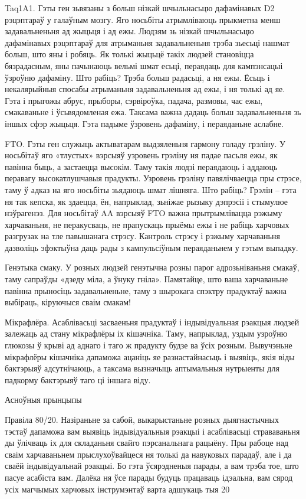 Taq1A1.
Гэты ген зьвязаны з больш нізкай шчыльнасьцю дафамінавых D2 рэцэптараў у галаўным мозгу. Яго носьбіты атрымліваюць прыкметна менш задавальненьня ад жыцьця і ад ежы. Людзям зь нізкай шчыльнасьцю дафамінавых рэцэптараў для атрыманьня задавальненьня трэба зьесьці нашмат больш, што яны і робяць. Як толькі жыцьцё такіх людзей становіцца бязрадасным, яны пачынаюць вельмі шмат есьці, пераядаць для кампэнсацыі ўзроўню дафаміну. Што рабіць? Трэба больш радасьці, а ня ежы. Ёсьць і некалярыйныя спосабы атрыманьня задавальненьня ад ежы, і ня толькі ад яе. Гэта і прыгожы абрус, прыборы, сэрвіроўка, падача, размовы, час ежы, смакаваньне і ўсьвядомленая ежа. Таксама важна дадаць больш задавальненьня зь іншых сфэр жыцьця. Гэта падыме ўзровень дафаміну, і пераяданьне аслабне.

FTO.
Гэты ген служыць актыватарам выдзяленьня гармону голаду грэліну. У носьбітаў яго «тлустых» вэрсыяў узровень грэліну ня падае пасьля ежы, як павінна быць, а застаецца высокім. Таму такія людзі пераядаюць і аддаюць перавагу высокатлушчавыя прадукты. Узровень грэліну павялічваецца пры стрэсе, таму ў адказ на яго носьбіты зьядаюць шмат лішняга. Што рабіць? Грэлін – гэта ня так кепска, як здаецца, ён, напрыклад, зьніжае рызыку дэпрэсіі і стымулюе нэўрагенэз. Для носьбітаў AA вэрсыяў FTO важна прытрымлівацца рэжыму харчаваньня, не перакусваць, не прапускаць прыёмы ежы і не рабіць харчовых разгрузак на тле павышанага стрэсу. Кантроль стрэсу і рэжыму харчаваньня дазволіць эфэктыўна даць рады з кампульсіўным пераяданьнем у гэтым выпадку.

Генэтыка смаку.
У розных людзей генэтычна розны парог адрозьніваньня смакаў, таму сапраўды «дзеду міла, а ўнуку гніла». Памятайце, што ваша харчаваньне павінна прыносіць задавальненьне, таму з шырокага спэктру прадуктаў важна выбіраць, кіруючыся сваім смакам!

Мікрафлёра.
Асаблівасьці засваеньня прадуктаў і індывідуальная рэакцыя людзей залежаць ад стану мікрафлёры іх кішачніка. Таму, напрыклад, уздым узроўню глюкозы ў крыві ад аднаго і таго ж прадукту будзе ва ўсіх розным. Вывучэньне мікрафлёры кішачніка дапаможа ацаніць яе разнастайнасьць і выявіць, якія віды бактэрыяў адсутнічаюць, а таксама вызначыць аптымальныя нутрыенты для падкорму бактэрыяў таго ці іншага віду.

Асноўныя прынцыпы

Правіла 80/20.
Назіраньне за сабой, выкарыстаньне розных дыягнастычных тэстаў дапаможа вам выявіць індывідуальныя рэакцыі і асаблівасьці страваваньня ды ўлічваць іх для складаньня свайго пэрсанальнага рацыёну. Пры рабоце над сваім харчаваньнем прыслухоўвайцеся ня толькі да навуковых парадаў, але і да сваёй індывідуальнай рэакцыі. Бо гэта ўсярэдненыя парады, а вам трэба тое, што пасуе асабіста вам. Далёка ня ўсе парады будуць працаваць ідэальна, вам сярод усіх магчымых харчовых інструмэнтаў варта адшукаць тыя 20%

